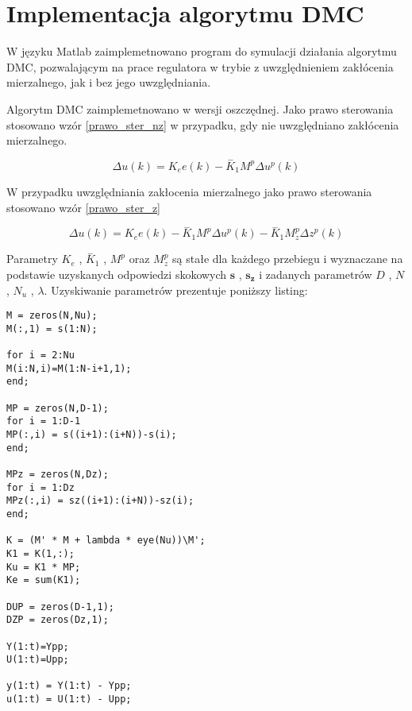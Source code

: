 \chapter{Implementacja algorytmu DMC}

W języku Matlab zaimplemetnowano program do symulacji działania algorytmu DMC, pozwalającym na prace regulatora w trybie z uwzględnieniem zakłócenia mierzalnego, jak i bez jego uwzględniania.

Algorytm DMC zaimplemetnowano w wersji oszczędnej. Jako prawo sterowania stosowano wzór \ref{prawo_ster_nz} w przypadku, gdy nie uwzględniano zakłócenia mierzalnego.

\begin{equation}
\Delta u\left(k\right)={K}_{e}e\left(k\right)-{\stackrel{-}{K}}_{1}{M}^{p}\Delta {u}^{p}(k)
\label{prawo_ster_nz}
\end{equation}

W przypadku uwzględniania zakłocenia mierzalnego jako prawo sterowania stosowano wzór \ref{prawo_ster_z}

\begin{equation}
\Delta u(k)={K}_{e}e(k)-{\stackrel{-}{K}}_{1}{M}^{p}\Delta{u}^{p}(k)-{\stackrel{-}{K}}_{1}{M}^{p}_{z}\Delta{z}^{p}(k)
\label{prawo_ster_z}
\end{equation}

Parametry {$K_e$} , {${{\stackrel{-}{K}}_{1}}$} , {${M}^{p}$} oraz {${M}^{p}_{z}$} są stałe dla każdego przebiegu i wyznaczane na podstawie uzyskanych odpowiedzi skokowych $\boldsymbol{s}$ , $\boldsymbol{s_z}$ i zadanych parametrów $D$ , $N$ , $N_u$ , $\lambda$. Uzyskiwanie parametrów prezentuje poniższy listing:

\begin{lstlisting}[style=Matlab-editor]
M = zeros(N,Nu);
M(:,1) = s(1:N);

for i = 2:Nu
M(i:N,i)=M(1:N-i+1,1);
end;

MP = zeros(N,D-1);
for i = 1:D-1
MP(:,i) = s((i+1):(i+N))-s(i);
end;

MPz = zeros(N,Dz);
for i = 1:Dz
MPz(:,i) = sz((i+1):(i+N))-sz(i);
end;

K = (M' * M + lambda * eye(Nu))\M';
K1 = K(1,:);
Ku = K1 * MP;
Ke = sum(K1);

DUP = zeros(D-1,1);
DZP = zeros(Dz,1);

Y(1:t)=Ypp;
U(1:t)=Upp;

y(1:t) = Y(1:t) - Ypp;
u(1:t) = U(1:t) - Upp;
\end{lstlisting}

